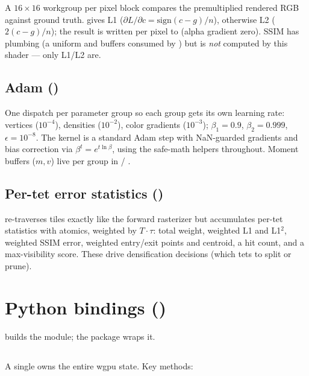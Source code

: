 A $16\times16$ workgroup per pixel block compares the premultiplied rendered
RGB against ground truth.  gives L1
($\partial L/\partial c = \text{sign}(c - g)/n$), otherwise L2
($2(c - g)/n$); the result is written per pixel to 
(alpha gradient zero). SSIM has plumbing (a  uniform and
 buffers consumed by ) but is \emph{not}
computed by this shader --- only L1/L2 are.

\subsection{Adam ()}

One dispatch per parameter group so each group gets its own learning rate:
vertices ($10^{-4}$), densities ($10^{-2}$), color gradients ($10^{-3}$);
$\beta_1 = 0.9$, $\beta_2 = 0.999$, $\epsilon = 10^{-8}$. The kernel is a
standard Adam step with NaN-guarded gradients and bias correction via
$\beta^t = e^{t \ln \beta}$, using the safe-math helpers throughout. Moment
buffers ($m, v$) live per group in  /
.

\subsection{Per-tet error statistics ()}

 re-traverses tiles exactly like the forward
rasterizer but accumulates per-tet statistics with atomics, weighted by
$T \cdot \tau$: total weight, weighted L1 and L1$^2$, weighted SSIM error,
weighted entry/exit points and centroid, a hit count, and a max-visibility
score. These drive densification decisions (which tets to split or prune).

\section{Python bindings ()}

 builds the  module; the
 package wraps it.

\subsection{}

A single \code{#[pyclass]} owns the entire wgpu state. Key methods:

